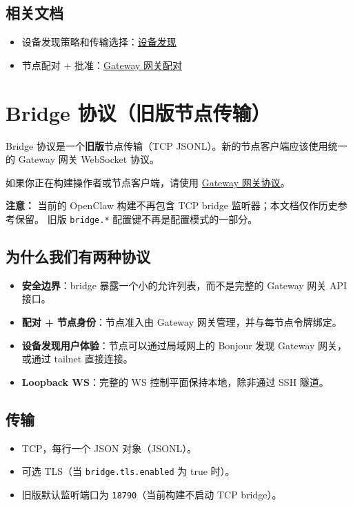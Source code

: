 \subsection{相关文档}


\begin{itemize}
  \item 设备发现策略和传输选择：\href{/gateway/discovery}{设备发现}
  \item 节点配对 + 批准：\href{/gateway/pairing}{Gateway 网关配对}
\end{itemize}



\clearpage

\section{Bridge 协议（旧版节点传输）}


Bridge 协议是一个\textbf{旧版}节点传输（TCP JSONL）。新的节点客户端应该使用统一的 Gateway 网关 WebSocket 协议。

如果你正在构建操作者或节点客户端，请使用 \href{/gateway/protocol}{Gateway 网关协议}。

\textbf{注意：} 当前的 OpenClaw 构建不再包含 TCP bridge 监听器；本文档仅作历史参考保留。
旧版 \texttt{bridge.*} 配置键不再是配置模式的一部分。

\subsection{为什么我们有两种协议}


\begin{itemize}
  \item \textbf{安全边界}：bridge 暴露一个小的允许列表，而不是完整的 Gateway 网关 API 接口。
  \item \textbf{配对 + 节点身份}：节点准入由 Gateway 网关管理，并与每节点令牌绑定。
  \item \textbf{设备发现用户体验}：节点可以通过局域网上的 Bonjour 发现 Gateway 网关，或通过 tailnet 直接连接。
  \item \textbf{Loopback WS}：完整的 WS 控制平面保持本地，除非通过 SSH 隧道。
\end{itemize}


\subsection{传输}


\begin{itemize}
  \item TCP，每行一个 JSON 对象（JSONL）。
  \item 可选 TLS（当 \texttt{bridge.tls.enabled} 为 true 时）。
  \item 旧版默认监听端口为 \texttt{18790}（当前构建不启动 TCP bridge）。
\end{itemize}


